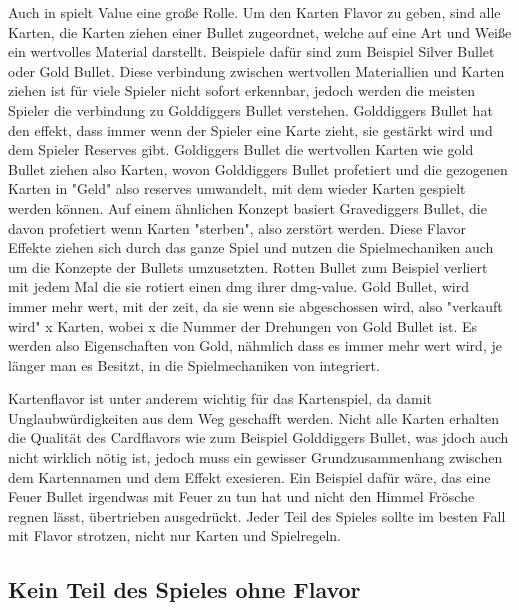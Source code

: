 Auch in \FF spielt Value eine große Rolle.
Um den Karten Flavor zu geben, sind alle Karten, die Karten ziehen einer Bullet zugeordnet, welche auf eine Art und Weiße ein wertvolles Material darstellt.
Beispiele dafür sind zum Beispiel Silver Bullet oder Gold Bullet. Diese verbindung zwischen wertvollen
Materiallien und Karten ziehen ist für viele Spieler nicht sofort erkennbar, jedoch werden die meisten Spieler die verbindung zu Golddiggers Bullet verstehen.
Golddiggers Bullet hat den effekt, dass immer wenn der Spieler eine Karte zieht, sie gestärkt wird und dem Spieler Reserves gibt.
Goldiggers Bullet die wertvollen Karten wie gold Bullet ziehen also Karten, wovon Golddiggers Bullet profetiert und die
gezogenen Karten in "Geld" also reserves umwandelt, mit dem wieder Karten gespielt werden können. Auf einem ähnlichen Konzept basiert Gravediggers Bullet, die davon profetiert wenn Karten "sterben", also zerstört werden.
Diese Flavor Effekte ziehen sich durch das ganze Spiel und nutzen die Spielmechaniken auch um die Konzepte der Bullets umzusetzten.
Rotten Bullet zum Beispiel verliert mit jedem Mal die sie rotiert einen dmg ihrer dmg-value. Gold Bullet, wird immer mehr
wert, mit der zeit, da sie wenn sie abgeschossen wird, also "verkauft wird" x Karten, wobei x die Nummer der Drehungen
von Gold Bullet ist. Es werden also Eigenschaften von Gold, nähmlich dass es immer mehr wert wird, je länger man es Besitzt,
in die Spielmechaniken von \FF integriert.


Kartenflavor ist unter anderem wichtig für das Kartenspiel, da damit Unglaubwürdigkeiten aus dem Weg geschafft werden.
Nicht alle Karten erhalten die Qualität des Cardflavors wie zum Beispiel Golddiggers Bullet, was jdoch auch nicht wirklich nötig ist, jedoch muss ein gewisser Grundzusammenhang zwischen dem Kartennamen und dem Effekt exesieren.
Ein Beispiel dafür wäre, das eine Feuer Bullet irgendwas mit Feuer zu tun hat und nicht den Himmel Frösche regnen lässt,
übertrieben ausgedrückt. Jeder Teil des Spieles sollte im besten Fall mit Flavor strotzen, nicht nur Karten und Spielregeln.



\subsection{Kein Teil des Spieles ohne Flavor}\label{subsec:keinTeildesSpielesOhneFlavor}

